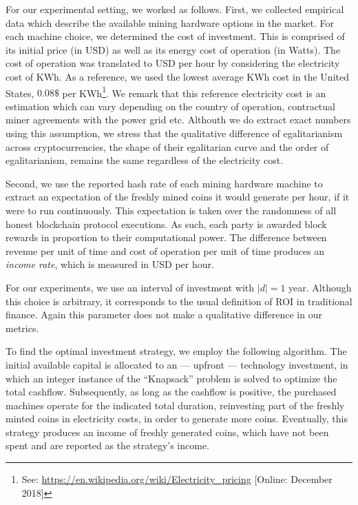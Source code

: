 For our experimental setting, we worked as follows. First, we collected
empirical data which describe the available mining hardware options in the
market. For each machine choice, we determined the cost of investment. This is
comprised of its initial price (in USD) as well as its energy cost of operation
(in Watts). The cost of operation was translated to USD per hour by considering
the electricity cost of KWh. As a reference, we used the lowest average KWh
cost in the United States, \ie $0.08\$$ per KWh\footnote{See:
\url{https://en.wikipedia.org/wiki/Electricity_pricing} [Online: December
2018]}. We remark that this reference electricity cost is an estimation which
can vary depending on the country of operation, contractual miner agreements
with the power grid etc. Althouth we do extract exact numbers using this
assumption, we stress that the qualitative difference of egalitarianism across
cryptocurrencies, \ie the shape of their egalitarian curve and the order of
egalitarianism, remains the same regardless of the electricity cost.

Second, we use the reported hash rate of each mining hardware machine to
extract an expectation of the freshly mined coins it would generate per hour,
if it were to run continuously. This expectation is taken over the randomness
of all honest blockchain protocol executions. As such, each party is awarded
block rewards in proportion to their computational power. The difference
between revenue per unit of time and cost of operation per unit of time
produces an \emph{income rate}, which is measured in USD per hour.

For our experiments, we use an interval of investment with $|d| = 1$ year. Although
this choice is arbitrary, it corresponds to the usual definition of ROI in
traditional finance. Again this parameter does not make a qualitative
difference in our metrics.

To find the optimal investment strategy, we employ the following algorithm. The
initial available capital is allocated to an --- upfront --- technology
investment, in which an integer instance of the ``Knapsack'' problem
\cite{mathews1896partition} is solved to optimize the total cashflow.
Subsequently, as long as the cashflow is positive, the purchased machines
operate for the indicated total duration, reinvesting part of the freshly
minted coins in electricity costs, in order to generate more coins. Eventually,
this strategy produces an income of freshly generated coins, which have not
been spent and are reported as the strategy's income.

